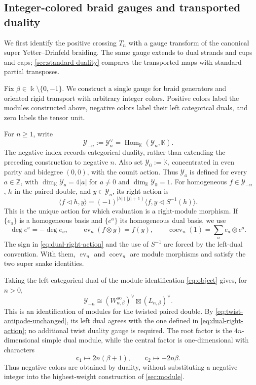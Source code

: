\documentclass[11pt,a4paper]{article}
\newcommand{\kk}{\Bbbk}
\newcommand{\hK}{\mathbb K}
\newcommand{\ot}{\otimes}
\newcommand{\tri}{\mathbin{\triangleleft}}
\newcommand{\ev}{\operatorname{ev}}
\newcommand{\coev}{\operatorname{coev}}
\newcommand{\ao}{\mathrm{ao}}
\theoremstyle{definition}
\theoremstyle{remark}
\begin{document}
\subsection{Integer-colored braid gauges and transported duality}
\label{sec:oriented-fixed-color}

We first identify the positive crossing \(T_n\) with a gauge transform
of the canonical super Yetter--Drinfeld braiding.  The same gauge extends
to dual strands and cups and caps; \cref{sec:standard-duality} compares
the transported maps with standard partial transposes.

Fix \(\beta\in\kk\setminus\{0,-1\}\).  We construct a single gauge
for braid generators and oriented rigid transport with arbitrary integer
colors.  Positive colors label the modules constructed above, negative
colors label their left categorical duals, and zero labels the tensor unit.

For \(n\geq1\), write
\[
 \mathcal Y_{-n}:=\mathcal Y_n^\vee
 =\operatorname{Hom}_{\hK}(\mathcal Y_n,\hK).
\]
The negative index records categorical duality, rather than extending
the preceding construction to negative \(n\).  Also set
\(\mathcal Y_0:=\hK\), concentrated in even parity and bidegree
\((0,0)\), with the counit action.  Thus \(\mathcal Y_a\) is defined
for every \(a\in\mathbb Z\), with
\(\dim_{\hK}\mathcal Y_a=4|a|\) for \(a\ne0\) and
\(\dim_{\hK}\mathcal Y_0=1\).
For homogeneous \(f\in\mathcal Y_{-n}\), \(h\) in the paired double,
and \(y\in\mathcal Y_n\), its right action is
\begin{equation}\label{eq:dual-right-action}
 \langle f\tri h,y\rangle
 =
 (-1)^{|h|(|f|+1)}
 \langle f,y\tri S^{-1}(h)\rangle.
\end{equation}
This is the unique action for which evaluation is a right-module
morphism.  If \(\{e_a\}\) is a homogeneous basis and \(\{e^a\}\) its
homogeneous dual basis, we use
\begin{equation}\label{eq:dual-degree-cups}
 \deg e^a=-\deg e_a,\qquad
 \ev_n(f\ot y)=f(y),\qquad
 \coev_n(1)=\sum_a e_a\ot e^a.
\end{equation}
The sign in \eqref{eq:dual-right-action} and the use of \(S^{-1}\) are
forced by the left-dual convention.  With them, \(\ev_n\) and
\(\coev_n\) are module morphisms and satisfy the two super snake
identities.

Taking the left categorical dual of the module identification
\eqref{eq:object} gives, for \(n>0\),
\begin{equation}\label{eq:negative-object-factorization}
 \mathcal Y_{-n}
 \cong (W_{n,\beta}^{\ao})^\vee
       \boxtimes (L_{n,\beta})^\vee.
\end{equation}
This is an identification of modules for the twisted paired double.
By \eqref{eq:twist-antipode-unchanged}, its left dual agrees with the
one defined in \eqref{eq:dual-right-action}; no additional twist
duality gauge is required.  The root factor is the \(4n\)-dimensional
simple dual module, while the central factor is one-dimensional with
characters
\[
 \mathsf c_1\mapsto 2n(\beta+1),\qquad
 \mathsf c_2\mapsto-2n\beta.
\]
Thus negative colors are obtained by duality, without substituting a
negative integer into the highest-weight construction of \cref{sec:module}.
\end{document}
